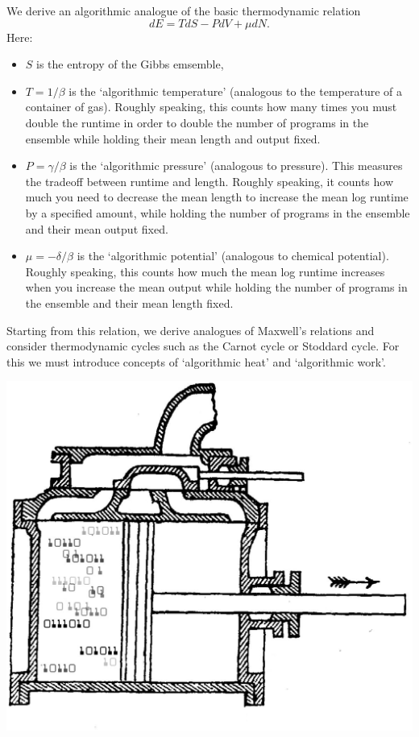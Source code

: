 \documentclass{article}
\begin{document}
We derive an algorithmic analogue of the basic thermodynamic relation
\[          dE = T dS - P dV + \mu dN . \]
Here:
\begin{itemize}
\item 
$S$ is the entropy of the Gibbs emsemble,
\item
$T = 1/\beta$ is the `algorithmic temperature' (analogous to the
temperature of a container of gas).  Roughly speaking, this counts how
many times you must double the runtime in order to double the number
of programs in the ensemble while holding their mean length and output
fixed.
\item
$P = \gamma/\beta$ is the `algorithmic pressure' (analogous to
pressure).  This measures the tradeoff between runtime and length.
Roughly speaking, it counts how much you need to decrease the mean
length to increase the mean log runtime by a specified amount, while
holding the number of programs in the ensemble and their mean output
fixed.
\item
$\mu = -\delta/\beta$ is the `algorithmic potential' (analogous to
chemical potential).  Roughly speaking, this counts how much the mean
log runtime increases when you increase the mean output while holding
the number of programs in the ensemble and their mean length fixed.
\end{itemize}

Starting from this relation, we derive analogues of Maxwell's
relations and consider thermodynamic cycles such as the Carnot cycle
or Stoddard cycle.  For this we must introduce concepts of `algorithmic 
heat' and `algorithmic work'.

\begin{center}
\includegraphics[scale=0.15, angle=0.3]{piston.eps}
\end{center}
\end{document}
